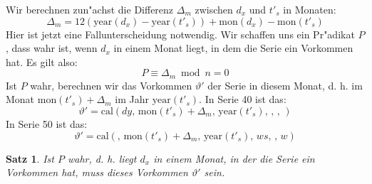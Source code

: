 \documentclass[a4paper]{article}
\newcommand*{\monf}{\mathrm{mon}}
\newcommand*{\yearf}{\mathrm{year}}
\newcommand*{\calf}{\mathrm{cal}}
\numberwithin{equation}{section}
\newtheorem{thm}{Satz}
\begin{document}
Wir berechnen zun"achst die Differenz $\Delta_m$ zwischen $d_x$ und $t'_s$ in
Monaten:
\begin{equation}\label{eqn:deltaM}
  \Delta_m = 12 (\yearf(d_x)-\yearf(t'_s)) + \monf(d_x) - \monf(t'_s)
\end{equation}
Hier ist jetzt eine Fallunterscheidung notwendig. Wir schaffen uns ein Pr"adikat
$P$, dass wahr ist, wenn $d_x$ in einem Monat liegt, in dem die Serie ein
Vorkommen hat. Es gilt also:
\begin{equation}P \equiv \Delta_m \bmod n = 0\end{equation}
Ist $P$ wahr, berechnen wir das Vorkommen $\vartheta'$ der Serie in diesem
Monat, d. h. im Monat $\monf(t'_s) + \Delta_m$ im Jahr $\yearf(t'_s)$. In Serie
40 ist das:
\begin{equation}\label{eqn:thetaStrich40}
  \vartheta' = \calf(dy,\,\monf(t'_s) + \Delta_m,\,\yearf(t'_s),\,,\,,\,)
\end{equation}
In Serie 50 ist das:
\begin{equation}\label{eqn:thetaStrich50}
  \vartheta' = \calf(,\,\monf(t'_s) + \Delta_m,\,\yearf(t'_s),\,ws,\,,\,w)
\end{equation}
\begin{thm}
  Ist $P$ wahr, d. h. liegt $d_x$ in einem Monat, in der die Serie ein Vorkommen
  hat, muss dieses Vorkommen $\vartheta'$ sein.
\end{thm}
\end{document}
